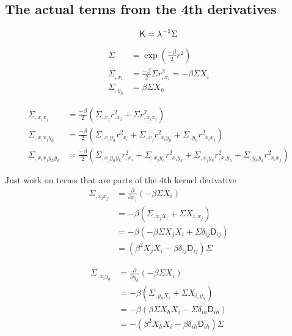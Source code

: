 \subsection{The actual terms from the 4th derivatives}
\begin{equation*}
\mathsf{K} = \lambda^{-1} \Sigma 
\end{equation*}

\begin{align}
\Sigma &= \exp{\left(\frac{-\beta}{2} r^2 \right)}\\
\Sigma_{,x_i} &= \frac{-\beta}{2} \Sigma r^2_{,x_i} = -\beta \Sigma X_i\\ 
\Sigma_{,y_h} &= \beta \Sigma X_h 
\end{align}

\begin{align}
\Sigma_{,x_i x_j} &= \frac{-\beta}{2}(\Sigma_{,x_j} r^2_{,x_i} + \Sigma r^2_{,x_i x_j})\\
\Sigma_{,x_i x_j y_h} &= \frac{-\beta}{2}(\Sigma_{,x_j y_h} r^2_{,x_i} + \Sigma_{,x_j}
r^2_{,x_i y_h} + \Sigma_{,y_h} r^2_{,x_i x_j})\\
\Sigma_{,x_i x_j y_h y_k} &= \frac{-\beta}{2} 
(\Sigma_{,x_j y_h y_k} r^2_{,x_i} +
\Sigma_{,x_j y_h} r^2_{,x_i y_k} + 
\Sigma_{,x_j y_k} r^2_{,x_i y_h} + 
\Sigma_{,y_h y_k} r^2_{,x_i x_j} )
\label{eq:4th_derivative_intermediate_expression}
\end{align}

Just work on terms that are parts of the 4th kernel derivative 
\begin{align*}
\Sigma_{,x_i x_j} &= \frac{\partial}{\partial x_j} (-\beta \Sigma X_i)\\
&= -\beta(\Sigma_{,x_j X_i} + \Sigma X_{i, x_j})\\ 
&= -\beta(-\beta \Sigma X_j X_i + \Sigma \delta_{ij} \mathsf{D}_{ij}) \\ 
&= (\beta^2 X_j X_i - \beta \delta_{ij} \mathsf{D}_{ij})\Sigma 
\end{align*}

\begin{align*}
\Sigma_{,x_i y_h} &= \frac{\partial}{\partial y_h} (-\beta \Sigma X_i)\\
&= -\beta(\Sigma_{,y_h X_i} + \Sigma X_{i, y_h})\\ 
&= -\beta(\beta \Sigma X_h X_i - \Sigma \delta_{ih} \mathsf{D}_{ih}) \\ 
&= -(\beta^2 X_h X_i - \beta \delta_{ih} \mathsf{D}_{ih})\Sigma 
\end{align*}

